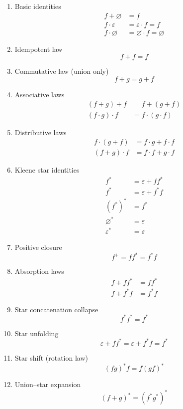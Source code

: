 \documentclass[12pt,a4paper,openany]{article}
\begin{document}
\begin{enumerate}

\item Basic identities
\[
\begin{aligned}
f + \varnothing &= f \\
f \cdot \varepsilon &= \varepsilon \cdot f = f \\
f \cdot \varnothing &= \varnothing \cdot f = \varnothing
\end{aligned}
\]

\item Idempotent law
\[
f + f = f
\]

\item Commutative law (union only)
\[
f + g = g + f
\]

\item Associative laws
\[
\begin{aligned}
(f + g) + f &= f + (g + f) \\
(f \cdot g) \cdot f &= f \cdot (g \cdot f)
\end{aligned}
\]

\item Distributive laws
\[
\begin{aligned}
f \cdot (g + f) &= f \cdot g + f \cdot f \\
(f + g) \cdot f &= f \cdot f + g \cdot f
\end{aligned}
\]

\item Kleene star identities
\[
\begin{aligned}
f^* &= \varepsilon + f f^* \\
f^* &= \varepsilon + f^* f \\
(f^*)^* &= f^* \\
\varnothing^* &= \varepsilon \\
\varepsilon^* &= \varepsilon
\end{aligned}
\]

\item Positive closure
\[
f^+ = f f^* = f^* f
\]

\item Absorption laws
\[
\begin{aligned}
f + f f^* &= f f^* \\
f + f^* f &= f^* f
\end{aligned}
\]

\item Star concatenation collapse
\[
f^* f^* = f^*
\]

\item Star unfolding
\[
\varepsilon + f f^* = \varepsilon + f^* f = f^*
\]

\item Star shift (rotation law)
\[
(fg)^* f = f (gf)^*
\]

\item Union–star expansion
\[
(f + g)^* = (f^* g^*)^*
\]

\end{enumerate}
\end{document}
